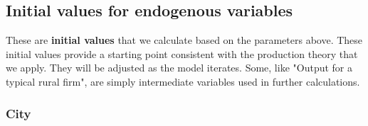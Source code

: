 \subsection{Initial values for endogenous variables} \label{sec-init-value-list}

These are \textbf{initial values} that we calculate based on the parameters above. These initial values provide  a starting point consistent with the production theory that we apply. They will be adjusted as the model iterates.  Some, like "Output for a typical rural firm", are simply intermediate variables used in further calculations.%

\subsubsection{City}
